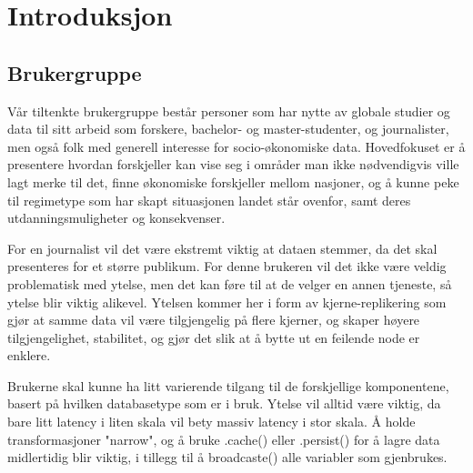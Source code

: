 \section{Introduksjon}

\subsection{Brukergruppe}
Vår tiltenkte brukergruppe består personer som har nytte av globale studier og data til sitt arbeid som forskere, bachelor- og master-studenter, og journalister, men også folk med generell interesse for socio-økonomiske data. Hovedfokuset er å presentere hvordan forskjeller kan vise seg i områder man ikke nødvendigvis ville lagt merke til det, finne økonomiske forskjeller mellom nasjoner, og å kunne peke til regimetype som har skapt situasjonen landet står ovenfor, samt deres utdanningsmuligheter og konsekvenser.

For en journalist vil det være ekstremt viktig at dataen stemmer, da det skal presenteres for et større publikum. For denne brukeren vil det ikke være veldig problematisk med ytelse, men det kan føre til at de velger en annen tjeneste, så ytelse blir viktig alikevel. Ytelsen kommer her i form av kjerne-replikering som gjør at samme data vil være tilgjengelig på flere kjerner, og skaper høyere tilgjengelighet, stabilitet, og gjør det slik at å bytte ut en feilende node er enklere.

Brukerne skal kunne ha litt varierende tilgang til de forskjellige komponentene, basert på hvilken databasetype som er i bruk. Ytelse vil alltid være viktig, da bare litt latency i liten skala vil bety massiv latency i stor skala. Å holde transformasjoner "narrow", og å bruke .cache() eller .persist() for å lagre data midlertidig blir viktig, i tillegg til å broadcaste() alle variabler som gjenbrukes.




